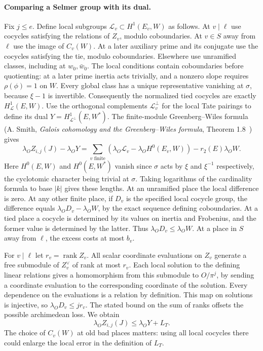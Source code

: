 \paragraph{Comparing a Selmer group with its dual.}
Fix $j\le e$. Define local subgroups $\mathcal L_v\subset H^1(E_v,W)$
as follows. At $v\mid\ell$ use cocycles satisfying the relations of
$Z_v$, modulo coboundaries. At $v\in S$ away from $\ell$ use the image
of $C_v(W)$. At a later auxiliary prime and its conjugate use the
cocycles satisfying the tie, modulo coboundaries. Elsewhere use
unramified classes, including at $w_0,\bar w_0$. The local conditions
contain coboundaries before quotienting: at a later prime inertia acts
trivially, and a nonzero slope requires $\rho(\phi)=1$ on $W$.
Every global class has a unique representative vanishing at $\sigma$,
because $\xi-1$ is invertible. Consequently the normalized tied cocycles
are exactly $H^1_{\mathcal L}(E,W)$. Use the orthogonal complements
$\mathcal L_v^\perp$ for the local Tate pairings to define its dual
$Y=H^1_{\mathcal L^\perp}(E,W^*)$. The finite-module Greenberg--Wiles
formula (A. Smith, \emph{Galois cohomology and the Greenberg--Wiles
formula}, Theorem 1.8~\cite{smith}) gives
\[
 \lambda_O Z_{i,j}(J)-\lambda_O Y
 = \sum_{v\text{ finite}}
       (\lambda_O\mathcal L_v-\lambda_O H^0(E_v,W))
       -r_2(E)\lambda_O W .
\]
Here $H^0(E,W)$ and $H^0(E,W^*)$ vanish since $\sigma$ acts by $\xi$
and $\xi^{-1}$ respectively, the cyclotomic character being trivial at
$\sigma$. Taking logarithms of the cardinality formula to base $|k|$
gives these lengths. At an unramified place the local difference is
zero. At any other finite place, if $D_v$ is the specified local
cocycle group, the difference equals $\lambda_O D_v-\lambda_O W$,
by the exact sequence defining coboundaries. At a tied place a cocycle
is determined by its values on inertia and Frobenius, and the former
value is determined by the latter. Thus $\lambda_O D_v\leq\lambda_O W$.
At a place in $S$ away from $\ell$, the excess costs at most $b_v$.

For $v\mid\ell$ let $r_v=\operatorname{rank} Z_v$.
All scalar coordinate evaluations on $Z_v$ generate a free
submodule of $Z_v^\vee$ of rank at most $r_v$. Each local solution to
the defining linear relations gives a homomorphism from this submodule to
$O/\pi^j$, by sending a coordinate evaluation to the corresponding
coordinate of the solution. Every dependence on the evaluations is a
relation by definition. This map on solutions is injective, so
$\lambda_O D_v\le jr_v$. The stated bound on the sum of ranks offsets the
possible archimedean loss. We obtain
\[
                    \lambda_O Z_{i,j}(J)\leq\lambda_O Y+L_T .
\]
The choice of $C_v(W)$ at old bad places matters: using all local
cocycles there could enlarge the local error in the definition of $L_T$.

